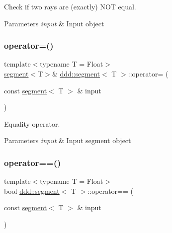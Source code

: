 Check if two rays are (exactly) N\+OT equal. 


\begin{DoxyParams}{Parameters}
{\em input} & Input object \\
\hline
\end{DoxyParams}
\mbox{\label{classddd_1_1segment_a76da84441d5e0f8c2e69029b193de84c}} 
\subsubsection{\texorpdfstring{operator=()}{operator=()}}
{\footnotesize\ttfamily template$<$typename T = Float$>$ \\
\hyperlink{classddd_1_1segment}{segment}$<$T$>$\& \hyperlink{classddd_1_1segment}{ddd\+::segment}$<$ T $>$\+::operator= (\begin{DoxyParamCaption}\item[{const \hyperlink{classddd_1_1segment}{segment}$<$ T $>$ \&}]{input }\end{DoxyParamCaption})\hspace{0.3cm}{\ttfamily [inline]}}



Equality operator. 


\begin{DoxyParams}{Parameters}
{\em input} & Input segment object \\
\hline
\end{DoxyParams}
\mbox{\label{classddd_1_1segment_ae4c9007a263679e0f0b06f3d75de9e97}} 
\subsubsection{\texorpdfstring{operator==()}{operator==()}}
{\footnotesize\ttfamily template$<$typename T = Float$>$ \\
bool \hyperlink{classddd_1_1segment}{ddd\+::segment}$<$ T $>$\+::operator== (\begin{DoxyParamCaption}\item[{const \hyperlink{classddd_1_1segment}{segment}$<$ T $>$ \&}]{input }\end{DoxyParamCaption})\hspace{0.3cm}{\ttfamily [inline]}}



